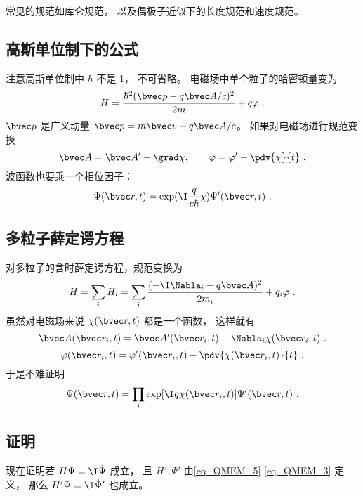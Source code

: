 常见的规范如库仑规范， 以及偶极子近似下的长度规范和速度规范。

\subsection{高斯单位制下的公式}
注意高斯单位制中 $\hbar$ 不是 1， 不可省略。 电磁场中单个粒子的哈密顿量变为
\begin{equation}
H = \frac{\hbar^2(\bvec p - q\bvec A/c)^2}{2m} + q\varphi~.
\end{equation}
$\bvec p$ 是广义动量 $\bvec p=m\bvec v+q\bvec A/c$。
如果对电磁场进行规范变换
\begin{equation}
\bvec A=\bvec A'+\grad \chi,\qquad \varphi =\varphi' - \pdv{\chi}{t}~.
\end{equation}
波函数也要乘一个相位因子：
\begin{equation}
\Psi(\bvec r,t)=\exp(\I\frac{q}{c\hbar} \chi)\Psi'(\bvec r,t)~.
\end{equation}

\subsection{多粒子薛定谔方程}
对多粒子的含时薛定谔方程，规范变换为
\begin{equation}
H = \sum_i H_i = \sum_i \frac{(-\I\Nabla_i - q\bvec A)^2}{2m_i} + q_i\varphi~.
\end{equation}
虽然对电磁场来说 $\chi(\bvec r, t)$ 都是一个函数， 这样就有
\begin{equation}
\bvec A(\bvec r_i, t) = \bvec A'(\bvec r_i, t) + \Nabla_i \chi(\bvec r_i, t)~.
\end{equation}
\begin{equation}
\varphi(\bvec r_i, t) = \varphi'(\bvec r_i, t) - \pdv{\chi(\bvec r_i, t)}{t}~.
\end{equation}
于是不难证明
\begin{equation}
\Psi(\bvec r,t)= \prod_i \exp[\I q\chi(\bvec r_i, t)]\Psi'(\bvec r,t)~.
\end{equation}

\subsection{证明}
现在证明若 $H\Psi = \I \dot\Psi$ 成立， 且 $H', \Psi'$ 由\autoref{eq_QMEM_5} \autoref{eq_QMEM_3} 定义， 那么 $H'\Psi = \I \dot\Psi'$ 也成立。

